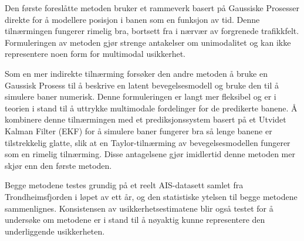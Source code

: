 Den første foreslåtte metoden bruker et rammeverk basert på Gaussiske Prosesser direkte for å modellere posisjon i banen som en funksjon av tid. Denne tilnærmingen fungerer rimelig bra, bortsett fra i nærvær av forgrenede trafikkfelt. Formuleringen av metoden gjør strenge antakelser om unimodalitet og kan ikke representere noen form for multimodal usikkerhet.

Som en mer indirekte tilnærming forsøker den andre metoden å bruke en Gaussisk Prosess til å beskrive en latent bevegelsesmodell og bruke den til å simulere baner numerisk. Denne formuleringen er langt mer fleksibel og er i teorien i stand til å uttrykke multimodale fordelinger for de predikerte banene. Å kombinere denne tilnærmingen med et prediksjonssystem basert på et Utvidet Kalman Filter (EKF) for å simulere baner fungerer bra så lenge banene er tilstrekkelig glatte, slik at en Taylor-tilnærming av bevegelsesmodellen fungerer som en rimelig tilnærming. Disse antagelsene gjør imidlertid denne metoden mer skjør enn den første metoden.

Begge metodene testes grundig på et reelt AIS-datasett samlet fra Trondheimsfjorden i løpet av ett år, og den statistiske ytelsen til begge metodene sammenlignes. Konsistensen av usikkerhetsestimatene blir også testet for å undersøke om metodene er i stand til å nøyaktig kunne representere den underliggende usikkerheten.





